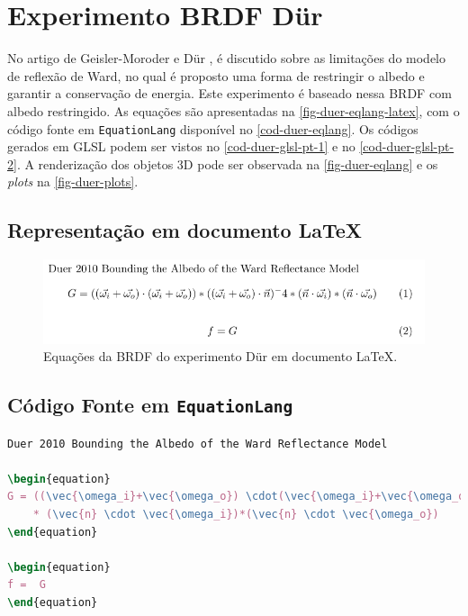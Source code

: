 \section{Experimento BRDF Dür}
\label{section-experiment-duer}

No artigo de Geisler-Moroder e Dür \cite{duer2010bounding}, é discutido sobre as limitações do modelo de reflexão de Ward, no qual é proposto uma forma de restringir o albedo e garantir a conservação de energia. Este experimento é baseado nessa BRDF com albedo restringido. As equações são apresentadas na \autoref{fig-duer-eqlang-latex}, com o código fonte em \texttt{EquationLang} disponível no \autoref{cod-duer-eqlang}. Os códigos gerados em GLSL podem ser vistos no \autoref{cod-duer-glsl-pt-1} e no \autoref{cod-duer-glsl-pt-2}. A renderização dos objetos 3D pode ser observada na \autoref{fig-duer-eqlang} e os \textit{plots} na \autoref{fig-duer-plots}.

\subsection{Representação em documento \LaTeX{}}
\begin{figure}[H]
    \caption{\label{fig-duer-eqlang-latex} \small Equações da BRDF do experimento Dür em documento \LaTeX{}.}
    \begin{center}
        \includegraphics[scale=0.92]{./Imagens/brdfs/duer.pdf}
    \end{center}
\end{figure}

\subsection{Código Fonte em \texttt{EquationLang}}
\begin{codigo}[H]
    \caption{\small Código fonte da BRDF do experimento Dür.}
    \label{cod-duer-eqlang}
\begin{lstlisting}[language=tex, frame=none, inputencoding=utf8]
Duer 2010 Bounding the Albedo of the Ward Reflectance Model

\begin{equation}
G = ((\vec{\omega_i}+\vec{\omega_o}) \cdot(\vec{\omega_i}+\vec{\omega_o})) * ((\vec{\omega_i}+\vec{\omega_o}) \cdot \vec{n})^-4
    * (\vec{n} \cdot \vec{\omega_i})*(\vec{n} \cdot \vec{\omega_o})
\end{equation}

\begin{equation}
f =  G
\end{equation}
\end{lstlisting}
\end{codigo}

